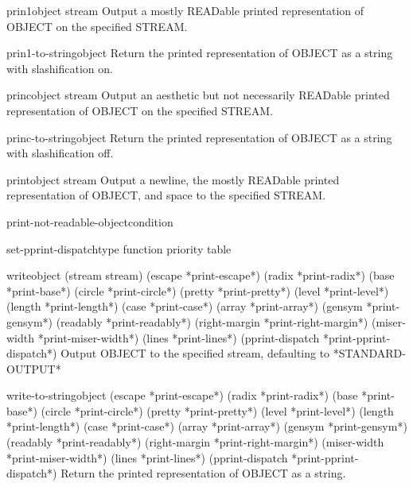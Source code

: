 \begin{function}{prin1}{object \op stream}{}{}
  Output a mostly READable printed representation of OBJECT on the specified
  STREAM.
\end{function}

\begin{function}{prin1-to-string}{object}{}{}
  Return the printed representation of OBJECT as a string with
   slashification on.
\end{function}

\begin{function}{princ}{object \op stream}{}{}
  Output an aesthetic but not necessarily READable printed representation
  of OBJECT on the specified STREAM.
\end{function}

\begin{function}{princ-to-string}{object}{}{}
  Return the printed representation of OBJECT as a string with
  slashification off.
\end{function}

\begin{function}{print}{object \op stream}{}{}
  Output a newline, the mostly READable printed representation of OBJECT, and
  space to the specified STREAM.
\end{function}

\begin{function}{print-not-readable-object}{condition}{}{}
  
\end{function}

\begin{function}{set-pprint-dispatch}{type function \op priority table}{}{}
  
\end{function}

\begin{function}{write}{object \key (stream stream) (escape *print-escape*) (radix *print-radix*)
 (base *print-base*) (circle *print-circle*) (pretty *print-pretty*)
 (level *print-level*) (length *print-length*) (case *print-case*)
 (array *print-array*) (gensym *print-gensym*) (readably *print-readably*)
 (right-margin *print-right-margin*) (miser-width *print-miser-width*)
 (lines *print-lines*) (pprint-dispatch *print-pprint-dispatch*)}{}{}
  Output OBJECT to the specified stream, defaulting to *STANDARD-OUTPUT*
\end{function}

\begin{function}{write-to-string}{object \key (escape *print-escape*) (radix *print-radix*) (base *print-base*)
 (circle *print-circle*) (pretty *print-pretty*) (level *print-level*)
 (length *print-length*) (case *print-case*) (array *print-array*)
 (gensym *print-gensym*) (readably *print-readably*)
 (right-margin *print-right-margin*) (miser-width *print-miser-width*)
 (lines *print-lines*) (pprint-dispatch *print-pprint-dispatch*)}{}{}
  Return the printed representation of OBJECT as a string.
\end{function}

